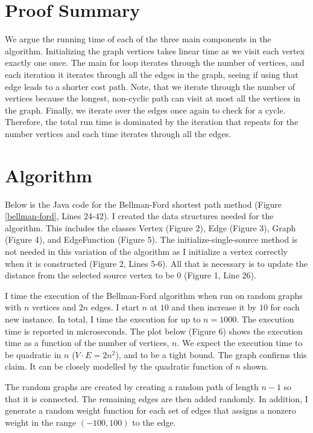 \documentclass[12pt]{article}
\begin{document}
\section*{Proof Summary}
We argue the running time of each of the three main components in the algorithm. Initializing the graph vertices takes linear time as we visit each vertex exactly one once. The main for loop iterates through the number of vertices, and each iteration it iterates  through all the edges in the graph, seeing if using that edge leads to a shorter cost path. Note, that we iterate through the number of vertices because the longest, non-cyclic path can visit at most all the vertices in the graph. Finally, we iterate over the edges once again to check for a cycle. Therefore, the total run time is dominated by the iteration that repeats for the number vertices and each time iterates through all the edges. 

\section*{Algorithm}
Below is the Java code for the Bellman-Ford shortest path method (Figure \ref{bellman-ford}, Lines 24-42). I created the data structures needed for the algorithm. This includes the classes Vertex (Figure 2), Edge (Figure 3), Graph (Figure 4), and EdgeFunction (Figure 5).  The initialize-single-source method is not needed in this variation of the algorithm as I initialize a vertex correctly when it is constructed (Figure 2, Lines 5-6). All that is necessary is to update the distance from the selected source vertex to be $0$ (Figure 1, Line 26). 

I time the execution of the Bellman-Ford algorithm when run on random graphs with $n$ vertices and $2n$ edges. I start $n$ at $10$ and then increase it by $10$ for each new instance. In total, I time the execution for up to $n=1000$. The execution time is reported in microseconds. The plot below (Figure 6) shows the execution time as a function of the number of vertices, $n$. We expect the execution time to be quadratic in $n$ ($V\cdot E = 2n^2$), and to be a tight bound. The graph confirms this claim. It can be closely modelled by the quadratic function of $n$ shown. 

The random graphs are created by creating a random path of length $n-1$ so that it is connected. The remaining edges are then added randomly. In addition, I generate a random weight function for each set of edges that assigns a nonzero weight in the range $(-100,100)$ to the edge. 
\end{document}
